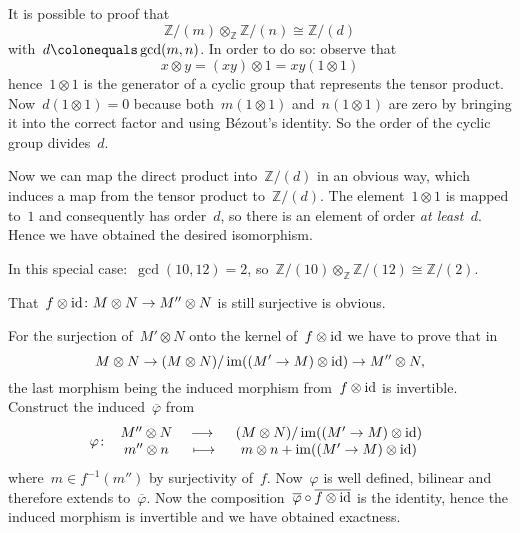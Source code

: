 \begin{exercise}
  It is possible to proof that
  \begin{equation}
    \mathbb{Z}/(m)\otimes_\mathbb{Z}\mathbb{Z}/(n)\cong\mathbb{Z}/(d)
  \end{equation}
  with~$d\colonequals\gcd(m,n)$. In order to do so: observe that
  \begin{equation}
    x\otimes y=\left( xy \right)\otimes 1=xy\left( 1\otimes 1 \right)
  \end{equation}
  hence~$1\otimes 1$ is the generator of a cyclic group that represents the tensor product. Now~$d(1\otimes 1)=0$ because both~$m(1\otimes 1)$ and~$n(1\otimes 1)$ are zero by bringing it into the correct factor and using B\'ezout's identity. So the order of the cyclic group divides~$d$.
  
  Now we can map the direct product into~$\mathbb{Z}/(d)$ in an obvious way, which induces a map from the tensor product to~$\mathbb{Z}/(d)$. The element~$1\otimes 1$ is mapped to~$1$ and consequently has order~$d$, so there is an element of order \emph{at least~$d$}. Hence we have obtained the desired isomorphism.

  In this special case:~$\gcd(10,12)=2$, so~$\mathbb{Z}/(10)\otimes_{\mathbb{Z}}\mathbb{Z}/(12)\cong\mathbb{Z}/(2)$.
\end{exercise}

\begin{exercise}
  \label{exercise:23h}
  That~$f\otimes\mathrm{id}\colon M\otimes N\to M''\otimes N$ is still surjective is obvious.

  For the surjection of~$M'\otimes N$ onto the kernel of~$f\otimes\mathrm{id}$ we have to prove that in
  \begin{equation}
    M\otimes N\to (M\otimes N)/\operatorname{im}((M'\to M)\otimes\mathrm{id})\to M''\otimes N,
  \end{equation}
  the last morphism being the induced morphism from~$f\otimes\mathrm{id}$ is invertible. Construct the induced~$\overline{\varphi}$ from
  \begin{equation}
    \map{\varphi}{M''\otimes N}{(M\otimes N)/\image((M'\to M)\otimes\identity)}{m''\otimes n}{m\otimes n+\image((M'\to M)\otimes\identity)}
  \end{equation}
  where~$m\in f^{-1}(m'')$ by surjectivity of~$f$. Now~$\varphi$ is well defined, bilinear and therefore extends to~$\overline{\varphi}$. Now the composition~$\overline{\varphi}\circ\overline{f\otimes\mathrm{id}}$ is the identity, hence the induced morphism is invertible and we have obtained exactness.
\end{exercise}

